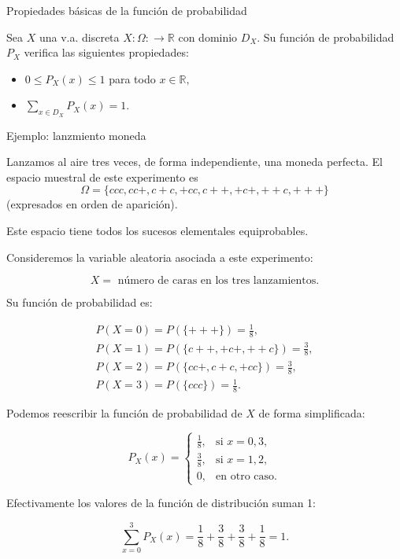 \documentclass[
  letterpaper,
  DIV=11,
  numbers=noendperiod]{scrreprt}
\providecommand{\tightlist}{%
  \setlength{\itemsep}{0pt}\setlength{\parskip}{0pt}}\usepackage{longtable,booktabs,array}
\begin{document}
\begin{Proposicion}{Propiedades básicas de la función de probabilidad}{}

Sea \(X\) una v.a. discreta \(X:\Omega:\to\mathbb{R}\) con dominio
\(D_X\). Su función de probabilidad \(P_{X}\) verifica las siguientes
propiedades:

\begin{itemize}
\tightlist
\item
  \(0\leq P_{X}(x)\leq 1\) para todo \(x\in\mathbb{R},\)
\item
  \(\sum\limits_{x\in D_X} P_{X}(x)=1.\)
\end{itemize}

\end{Proposicion}

\begin{Ejemplo}{Ejemplo: lanzmiento moneda}{}

Lanzamos al aire tres veces, de forma independiente, una moneda
perfecta. El espacio muestral de este experimento es
\[\Omega=\{ccc,cc+,c+c,+cc,c++,+c+,++c,+++\}\] (expresados en orden de
aparición).

Este espacio tiene todos los sucesos elementales equiprobables.

Consideremos la variable aleatoria asociada a este experimento:

\[X=\mbox{ número de caras en los tres lanzamientos}.\]

Su función de probabilidad es:

\[
\begin{array}{l}
P(X=0)=P(\{+++\})=\frac18,\\ P(X=1)=P(\{c++,+c+,++c\})=\frac38,\\
    P(X=2)=P(\{cc+,c+c,+cc\})=\frac38,\\
    P(X=3)=P(\{ccc\})=\frac18.
\end{array}
\]

Podemos reescribir la función de probabilidad de \(X\) de forma
simplificada:

\[P_{X}(x)=\left\{\begin{array}{ll} \frac18, & \mbox{si } x=0, 3,\\[0.5ex]
\frac38, & \mbox{si } x=1,2,\\ 0, & \mbox{en otro caso}.\end{array}\right.\]

Efectivamente los valores de la función de distribución suman 1:

\[\sum_{x=0}^3 P_X(x)= \frac18+\frac38+\frac38+\frac18=1.\]

\end{Ejemplo}
\end{document}
